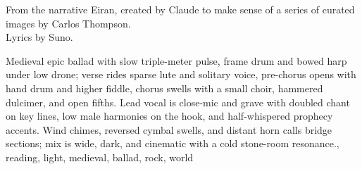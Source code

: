 
\begin{notes}
From the narrative Eiran, created by Claude to make sense of a series of curated images by Carlos Thompson.\\
Lyrics by Suno.
\end{notes}
\begin{style}
Medieval epic ballad with slow triple-meter pulse, frame drum and bowed harp under low drone; verse rides sparse lute and solitary voice, pre-chorus opens with hand drum and higher fiddle, chorus swells with a small choir, hammered dulcimer, and open fifths. %
Lead vocal is close-mic and grave with doubled chant on key lines, low male harmonies on the hook, and half-whispered prophecy accents. %
Wind chimes, reversed cymbal swells, and distant horn calls bridge sections; mix is wide, dark, and cinematic with a cold stone-room resonance., reading, light, medieval, ballad, rock, world
\end{style}
